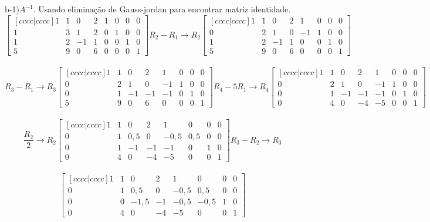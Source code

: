 b-1)$A^{-1}$. Usando eliminação de Gauss-jordan para encontrar matriz identidade.
\\

\[
    \begin{bmatrix}[cccc|cccc]
        1 & 1 & 0  & 2 & 1 & 0 & 0 & 0 \\
        1 & 3 & 1  & 2 & 0 & 1 & 0 & 0 \\
        1 & 2 & -1 & 1 & 0 & 0 & 1 & 0 \\
        5 & 9 & 0  & 6 & 0 & 0 & 0 & 1
    \end{bmatrix}
    R_2 - R_1\to R_2
    \begin{bmatrix}[cccc|cccc]
        1 & 1 & 0  & 2 & 1  & 0 & 0 & 0 \\
        0 & 2 & 1  & 0 & -1 & 1 & 0 & 0 \\
        1 & 2 & -1 & 1 & 0  & 0 & 1 & 0 \\
        5 & 9 & 0  & 6 & 0  & 0 & 0 & 1
    \end{bmatrix}
\]
\\
\[
    R_3 - R_1\to R_3
    \begin{bmatrix}[cccc|cccc]
        1 & 1 & 0  & 2  & 1  & 0 & 0 & 0 \\
        0 & 2 & 1  & 0  & -1 & 1 & 0 & 0 \\
        0 & 1 & -1 & -1 & -1 & 0 & 1 & 0 \\
        5 & 9 & 0  & 6  & 0  & 0 & 0 & 1
    \end{bmatrix}
    R_4 - 5R_1\to R_4
    \begin{bmatrix}[cccc|cccc]
        1 & 1 & 0  & 2  & 1  & 0 & 0 & 0 \\
        0 & 2 & 1  & 0  & -1 & 1 & 0 & 0 \\
        0 & 1 & -1 & -1 & -1 & 0 & 1 & 0 \\
        0 & 4 & 0  & -4 & -5 & 0 & 0 & 1
    \end{bmatrix}
\]
\\
\[
    \frac{R_2}{2}\to R_2
    \begin{bmatrix}[cccc|cccc]
        1 & 1 & 0   & 2  & 1    & 0   & 0 & 0 \\
        0 & 1 & 0,5 & 0  & -0,5 & 0,5 & 0 & 0 \\
        0 & 1 & -1  & -1 & -1   & 0   & 1 & 0 \\
        0 & 4 & 0   & -4 & -5   & 0   & 0 & 1
    \end{bmatrix}
    R_3 - R_2\to R_3
\]
\\
\[
    \begin{bmatrix}[cccc|cccc]
        1 & 1 & 0    & 2  & 1    & 0    & 0 & 0 \\
        0 & 1 & 0,5  & 0  & -0,5 & 0,5  & 0 & 0 \\
        0 & 0 & -1,5 & -1 & -0,5 & -0,5 & 1 & 0 \\
        0 & 4 & 0    & -4 & -5   & 0    & 0 & 1
    \end{bmatrix}
\]
